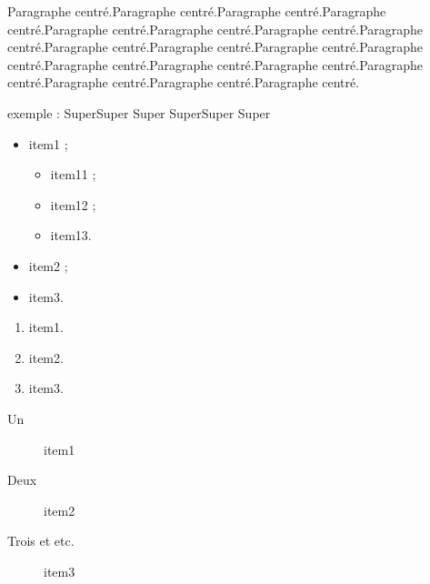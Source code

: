 \documentclass{article}
\begin{document}
\begin{center}%
Paragraphe centré.Paragraphe centré.Paragraphe centré.Paragraphe centré.Paragraphe centré.Paragraphe centré.Paragraphe centré.Paragraphe centré.Paragraphe centré.Paragraphe centré.Paragraphe centré.Paragraphe centré.Paragraphe centré.Paragraphe centré.Paragraphe centré.Paragraphe centré.Paragraphe centré.Paragraphe centré.Paragraphe centré.
\end{center}


exemple :
Super\hfill Super \hfill Super%
Super\vfill Super \vfill Super%

%

\begin{itemize}
\item item1 ;
\begin{itemize}
\item item11 ;
\item item12 ;
\item item13.
\end{itemize}
\item item2 ;
\item item3.
\end{itemize}

\begin{enumerate}
\item item1.
\item item2.
\item item3.
\end{enumerate}

\begin{description}
\item[Un] item1
\item[Deux] item2
\item[Trois et etc.] item3
\end{description}
\end{document}
